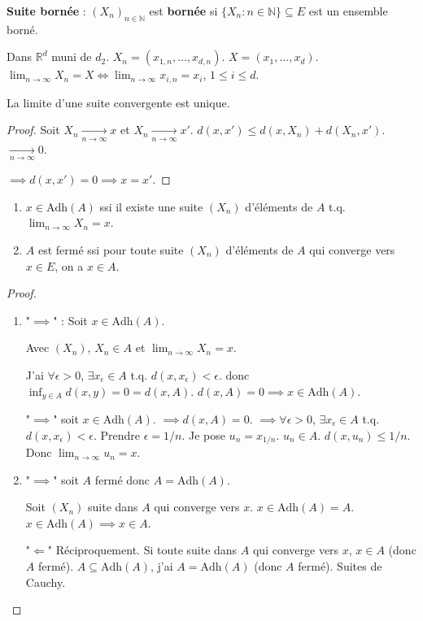 \documentclass[oneside]{book}
\begin{document}
\textbf{Suite bornée} : $(X_n)_{n \in \mathbb{N}}$ est \textbf{bornée} si $\{X_n : n \in \mathbb{N}\} \subseteq E$ est un ensemble borné.

\begin{remark}
Dans $\mathbb{R}^d$ muni de $d_2$.
$X_n = (x_{1, n}, \dots, x_{d, n})$.
$X = (x_1, \dots, x_d)$.
$\lim_{n \to \infty} X_n = X \iff \lim_{n \to \infty} x_{i, n} = x_i$, $1 \leq i \leq d$.
\end{remark}

\begin{proposition}
La limite d'une suite convergente est unique.
\end{proposition}

\begin{proof}
Soit $X_n \xrightarrow[n \to \infty]{} x$ et $X_n \xrightarrow[n \to \infty]{} x'$.
$d(x, x') \leq d(x, X_n) + d(X_n, x')$.
$\xrightarrow[n \to \infty]{} 0$.

$\implies d(x, x') = 0 \implies x = x'$.
\end{proof}

\begin{proposition}
\begin{enumerate}
    \item $x \in \text{Adh}(A)$ ssi il existe une suite $(X_n)$ d'éléments de $A$ t.q. $\lim_{n \to \infty} X_n = x$.
    \item $A$ est fermé ssi pour toute suite $(X_n)$ d'éléments de $A$ qui converge vers $x \in E$, on a $x \in A$.
\end{enumerate}
\end{proposition}

\begin{proof}
\begin{enumerate}
    \item "$\implies$" : Soit $x \in \text{Adh}(A)$.

    Avec $(X_n)$, $X_n \in A$ et $\lim_{n \to \infty} X_n = x$.

    J'ai $\forall \epsilon > 0$, $\exists x_\epsilon \in A$ t.q. $d(x, x_\epsilon) < \epsilon$.
    donc $\inf_{y \in A} d(x, y) = 0 = d(x, A)$.
    $d(x, A) = 0 \implies x \in \text{Adh}(A)$.

    "$\implies$" soit $x \in \text{Adh}(A)$.
    $\implies d(x, A) = 0$.
    $\implies \forall \epsilon > 0$, $\exists x_\epsilon \in A$ t.q. $d(x, x_\epsilon) < \epsilon$.
    Prendre $\epsilon = 1/n$. Je pose $u_n = x_{1/n}$.
    $u_n \in A$. $d(x, u_n) \leq 1/n$. Donc $\lim_{n \to \infty} u_n = x$.

    \item "$\implies$" soit $A$ fermé donc $A = \text{Adh}(A)$.

    Soit $(X_n)$ suite dans $A$ qui converge vers $x$.
    $x \in \text{Adh}(A) = A$.
    $x \in \text{Adh}(A) \implies x \in A$.

    "$\Longleftarrow$" Réciproquement.
    Si toute suite dans $A$ qui converge vers $x$, $x \in A$ (donc $A$ fermé).
    $A \subseteq \text{Adh}(A)$, j'ai $A = \text{Adh}(A)$ (donc $A$ fermé).
    Suites de Cauchy.
\end{enumerate}
\end{proof}
\end{document}
